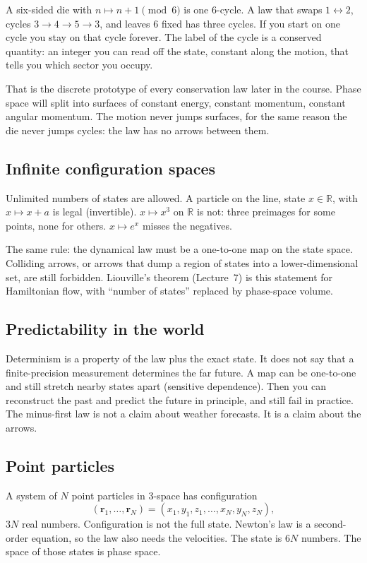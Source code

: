 \documentclass[11pt]{article}
\numberwithin{equation}{section}
\newcommand{\vect}[1]{\mathbf{#1}}
\begin{document}
A six-sided die with $n\mapsto n+1\pmod{6}$ is one 6-cycle. A law that swaps $1\leftrightarrow 2$, cycles $3\to 4\to 5\to 3$, and leaves $6$ fixed has three cycles. If you start on one cycle you stay on that cycle forever. The label of the cycle is a conserved quantity: an integer you can read off the state, constant along the motion, that tells you which sector you occupy.

That is the discrete prototype of every conservation law later in the course. Phase space will split into surfaces of constant energy, constant momentum, constant angular momentum. The motion never jumps surfaces, for the same reason the die never jumps cycles: the law has no arrows between them.

\subsection{Infinite configuration spaces}

Unlimited numbers of states are allowed. A particle on the line, state $x\in\mathbb{R}$, with $x\mapsto x+a$ is legal (invertible). $x\mapsto x^3$ on $\mathbb{R}$ is not: three preimages for some points, none for others. $x\mapsto e^x$ misses the negatives.

The same rule: the dynamical law must be a one-to-one map on the state space. Colliding arrows, or arrows that dump a region of states into a lower-dimensional set, are still forbidden. Liouville's theorem (Lecture~7) is this statement for Hamiltonian flow, with ``number of states'' replaced by phase-space volume.

\subsection{Predictability in the world}

Determinism is a property of the law plus the exact state. It does not say that a finite-precision measurement determines the far future. A map can be one-to-one and still stretch nearby states apart (sensitive dependence). Then you can reconstruct the past and predict the future in principle, and still fail in practice. The minus-first law is not a claim about weather forecasts. It is a claim about the arrows.

\subsection{Point particles}

A system of $N$ point particles in 3-space has configuration
\[
(\vect{r}_1,\ldots,\vect{r}_N)
= (x_1,y_1,z_1,\ldots,x_N,y_N,z_N),
\]
$3N$ real numbers. Configuration is not the full state. Newton's law is a second-order equation, so the law also needs the velocities. The state is $6N$ numbers. The space of those states is phase space.
\end{document}
